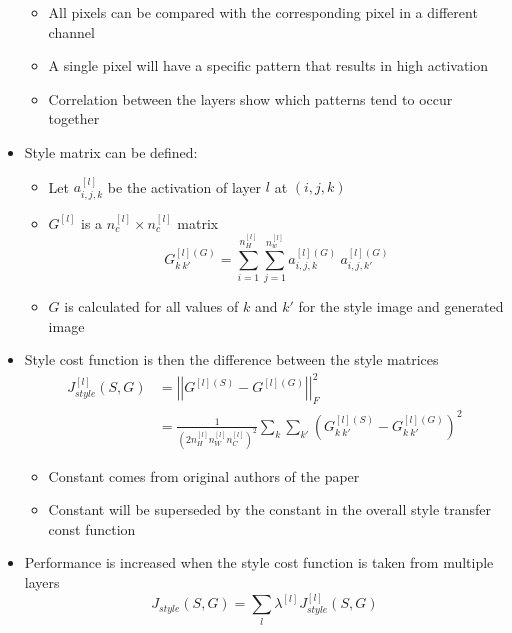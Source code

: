 \documentclass[12pt, letterpaper]{article}
\begin{document}
\begin{itemize}
        \begin{itemize}
            \item All pixels can be compared with the corresponding pixel in a different channel
            \item A single pixel will have a specific pattern that results in high activation
            \item Correlation between the layers show which patterns tend to occur together
        \end{itemize}
        \item Style matrix can be defined:
        \begin{itemize}
            \item Let $a_{i,j,k}^{[l]}$ be the activation of layer $l$ at $(i,j,k)$
            \item $G^{[l]}$ is a $n_c^{[l]}\times n_c^{[l]}$ matrix 
            $$G^{[l](G)}_{k~k'}=\sum_{i=1}^{n_H^{[l]}}\sum_{j=1}^{n_w^{[l]}}a^{[l](G)}_{i,j,k}~a^{[l](G)}_{i,j,k'}$$
            \item $G$ is calculated for all values of $k$ and $k'$ for the style image and generated image
        \end{itemize}
        \item Style cost function is then the difference between the style matrices
        \begin{align*}
            J_{style}^{[l]}(S,G)&=\left|\left|G^{[l](S)}-G^{[l](G)}\right|\right|^2_F \\
            &=\frac{1}{\left(2n_H^{[l]}n_W^{[l]}n_C^{[l]}\right)^2}\sum_k\sum_{k'}\left(G_{k~k'}^{[l](S)}-G_{k~k'}^{[l](G)}\right)^2
        \end{align*}
        \begin{itemize}
            \item Constant comes from original authors of the paper
            \item Constant will be superseded by the constant in the overall style transfer const function
        \end{itemize}
        \item Performance is increased when the style cost function is taken from multiple layers
        $$J_{style}(S,G)=\sum_l\lambda^{[l]}J_{style}^{[l]}(S,G)$$
    \end{itemize}
    
\end{document}
